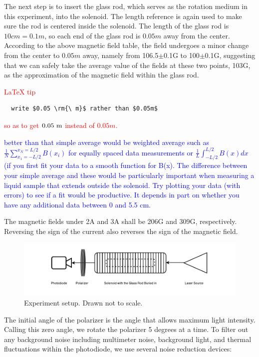 \documentclass[prb,preprint]{revtex4-1}
\begin{document}
The next step is to insert the glass rod, which serves as the rotation medium in this experiment, into the solenoid. The length reference is again used to make sure the rod is centered inside the solenoid. The length of the glass rod is $10cm=0.1m$, so each end of the glass rod is $0.05m$ away from the center. According to the above magnetic field table, the field undergoes a minor change from the center to $0.05m$ away, namely from 106.5$\pm$0.1G to 100$\pm$0.1G, suggesting that we can safely take the average value of the fields at these two points, 103G, as the approximation of the magnetic field within the glass rod. 

\textcolor{red}{LaTeX tip}
\begin{verbatim}
  write $0.05 \rm{\ m}$ rather than $0.05m$
\end{verbatim}
\textcolor{red}{so as to get $0.05 \rm{\ m}$ instead of $0.05m$. }


\textcolor{blue}{better than that simple average would be weighted average such as $\frac{1}{N} \sum_{x_1=-L/2}^{x_N = L/2}B(x_i)$  for equally spaced data measurements or  $\frac{1}{L} \int_{-L/2}^{L/2}B(x)dx$ (if you first fit your data to a smooth function for B(x). The difference between your simple average and these would be particularly important when measuring a liquid sample that extends outside the solenoid. Try plotting your data (with errors) to see if a fit would be productive. It depends in part on whether you have any additional data between 0 and 5.5 cm.}



The magnetic fields under 2A and 3A shall be 206G and 309G, respectively. Reversing the sign of the current also reverses the sign of the magnetic field.

\begin{figure}[H]
    \centering
    \includegraphics[width=180mm]{ExperimentSetup.pdf}
    \caption{Experiment setup. Drawn not to scale. }
    \end{figure}
    
The initial angle of the polarizer is the angle that allows maximum light intensity. Calling this zero angle, we rotate the polarizer 5 degrees at a time. To filter out any background noise including multimeter noise, background light, and thermal fluctuations within the photodiode, we use several noise reduction devices:
\end{document}
